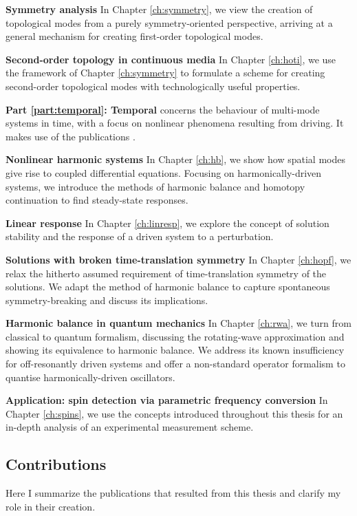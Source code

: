 \textbf{Symmetry analysis} In Chapter \ref{ch:symmetry}, we view the creation of topological modes from a purely symmetry-oriented perspective, arriving at a general mechanism for creating first-order topological modes. 

\textbf{Second-order topology in continuous media} In Chapter \ref{ch:hoti}, we use the framework of Chapter \ref{ch:symmetry} to formulate a scheme for creating second-order topological modes with technologically useful properties.

\textbf{Part \ref{part:temporal}: Temporal} concerns the behaviour of multi-mode systems in time, with a focus on nonlinear phenomena resulting from driving. It makes use of the publications \cite{Kosata_2022a, Kosata_2022b, Kosata_2020}.

\textbf{Nonlinear harmonic systems} In Chapter \ref{ch:hb}, we show how spatial modes give rise to coupled differential equations. Focusing on harmonically-driven systems, we introduce the methods of harmonic balance and homotopy continuation to find steady-state responses.

\textbf{Linear response} In Chapter \ref{ch:linresp}, we explore the concept of solution stability and the response of a driven system to a perturbation. 

\textbf{Solutions with broken time-translation symmetry} In Chapter \ref{ch:hopf}, we relax the hitherto assumed requirement of time-translation symmetry of the solutions. We adapt the method of harmonic balance to capture spontaneous symmetry-breaking and discuss its implications. 

\textbf{Harmonic balance in quantum mechanics} In Chapter \ref{ch:rwa}, we turn from classical to quantum formalism, discussing the rotating-wave approximation and showing its equivalence to harmonic balance. We address its known insufficiency for off-resonantly driven systems and offer a non-standard operator formalism to quantise harmonically-driven oscillators. 

\textbf{Application: spin detection via parametric frequency conversion} In Chapter \ref{ch:spins}, we use the concepts introduced throughout this thesis for an in-depth analysis of an experimental measurement scheme. 
%

\subsection*{Contributions}
Here I summarize the publications that resulted from this thesis and clarify my role in their creation.

